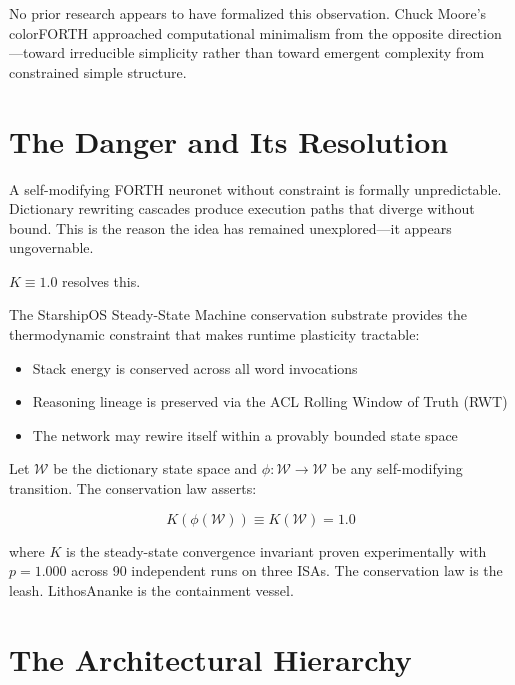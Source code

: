 \documentclass[11pt]{article}
\begin{document}
No prior research appears to have formalized this observation.
Chuck Moore's colorFORTH approached computational minimalism from the
opposite direction---toward irreducible simplicity rather than toward
emergent complexity from constrained simple structure.

\section{The Danger and Its Resolution}

A self-modifying FORTH neuronet without constraint is formally unpredictable.
Dictionary rewriting cascades produce execution paths that diverge without
bound. This is the reason the idea has remained unexplored---it appears
ungovernable.

$K \equiv 1.0$ resolves this.

The StarshipOS Steady-State Machine conservation substrate provides the
thermodynamic constraint that makes runtime plasticity tractable:

\begin{itemize}
  \item Stack energy is conserved across all word invocations
  \item Reasoning lineage is preserved via the ACL Rolling Window of Truth (RWT)
  \item The network may rewire itself within a provably bounded state space
\end{itemize}

Let $\mathcal{W}$ be the dictionary state space and $\phi: \mathcal{W}
\rightarrow \mathcal{W}$ be any self-modifying transition. The conservation
law asserts:

\begin{equation}
  K(\phi(\mathcal{W})) \equiv K(\mathcal{W}) = 1.0
\end{equation}

where $K$ is the steady-state convergence invariant proven experimentally
with $p = 1.000$ across 90 independent runs on three ISAs. The conservation
law is the leash. LithosAnanke is the containment vessel.

\section{The Architectural Hierarchy}
\end{document}

